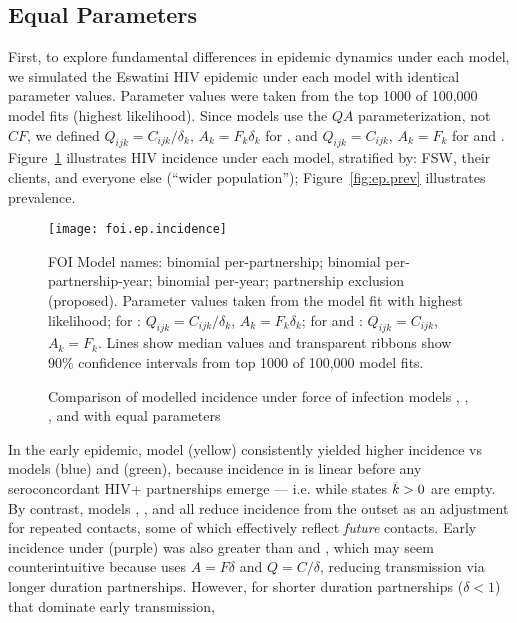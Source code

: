 \subsection{Equal Parameters}\label{exp.ep}
First, to explore fundamental differences in epidemic dynamics under each model,
we simulated the Eswatini HIV epidemic under each model with identical parameter values.
Parameter values were taken from
the top 1000 of 100,000 model  fits (highest likelihood).
Since models  use the $QA$ parameterization, not $CF$, we defined
$Q_{ijk} = C_{ijk} / \delta_k$, $A_{k} = F_{k} \delta_k$ for , and
$Q_{ijk} = C_{ijk}$, $A_{k} = F_{k}$ for  and .
Figure~\ref{fig:ep.inc} illustrates HIV incidence under each model,
stratified by: FSW, their clients, and everyone else (``wider population'');
Figure~\ref{fig:ep.prev} illustrates prevalence.
\begin{figure}[h]
  \centerline{\texttt{[image: foi.ep.incidence]}}
  \caption{Comparison of modelled incidence under force of infection models
    , , , and  with equal parameters}
  \label{fig:ep.inc}
  \floatfoot
  FOI Model names:
   binomial per-partnership;
   binomial per-partnership-year;
   binomial per-year;
   partnership exclusion (proposed).
  Parameter values taken from the  model fit with highest likelihood;
  for : $Q_{ijk} = C_{ijk} / \delta_k$, $A_{k} = F_{k} \delta_k$;
  for  and : $Q_{ijk} = C_{ijk}$, $A_{k} = F_{k}$.
  Lines show median values and transparent ribbons show 90\% confidence intervals
  from top 1000 of 100,000  model fits.
\end{figure}
\par
In the early epidemic, model  (yellow) consistently yielded higher incidence
vs models  (blue) and  (green),
because incidence in  is linear before any seroconcordant HIV+ partnerships emerge
--- i.e. while states $\k > 0$ are empty.
By contrast, models , , and  all reduce incidence from the outset
as an adjustment for repeated contacts, some of which effectively reflect \emph{future} contacts.
Early incidence under  (purple) was also greater than  and ,
which may seem counterintuitive because  uses $A = F \delta$ and $Q = C / \delta$,
reducing transmission via longer duration partnerships.
However, for shorter duration partnerships ($\delta < 1$) that dominate early transmission,
